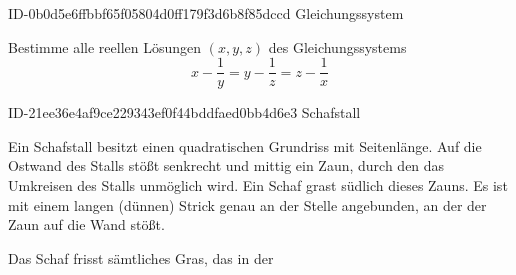 \begin{exercise}
      {ID-0b0d5e6ffbbf65f05804d0ff179f3d6b8f85dccd}
      {Gleichungssystem}
  \ifproblem\problem\par
    Bestimme alle reellen Lösungen $(x,y,z)$ des
    Gleichungssystems
    \begin{equation*}
      x-\frac{1}{y}
      =y-\frac{1}{z}
      =z-\frac{1}{x}
    \end{equation*}
  \fi
\end{exercise}

\begin{exercise}
      {ID-21ee36e4af9ce229343ef0f44bddfaed0bb4d6e3}
      {Schafstall}
  \ifproblem\problem\par
    Ein Schafstall besitzt einen quadratischen
    Grundriss mit  Seitenlänge. Auf
    die Ostwand des Stalls stößt senkrecht und
    mittig ein Zaun, durch den das Umkreisen
    des Stalls unmöglich wird. Ein Schaf grast
    südlich dieses Zauns. Es ist mit einem
     langen (dünnen) Strick genau
    an der Stelle angebunden, an der der Zaun
    auf die Wand stößt.
    \begin{center}
    \end{center}
    Das Schaf frisst sämtliches Gras, das in der

\end{exercise}
